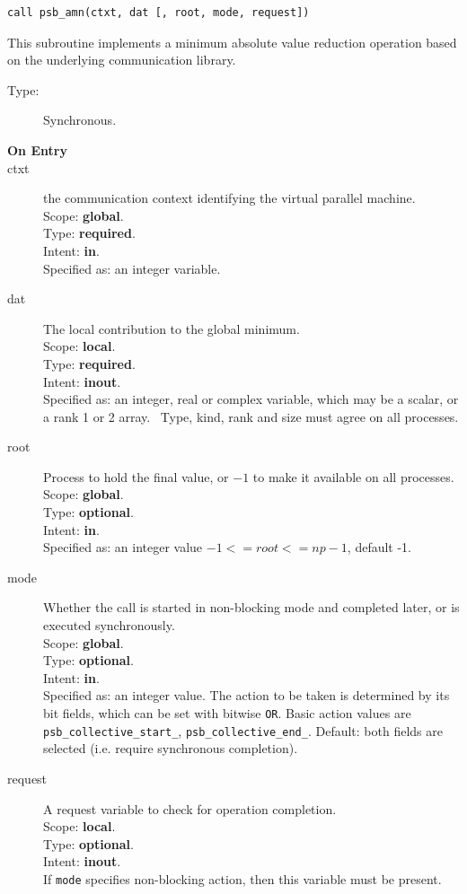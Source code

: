 \begin{verbatim}
call psb_amn(ctxt, dat [, root, mode, request])
\end{verbatim}

This subroutine implements a minimum absolute value reduction
operation based on the underlying communication library. 
\begin{description}
\item[Type:] Synchronous.
\item[\bf  On Entry ]
\item[ctxt] the communication context identifying the virtual
  parallel machine.\\
Scope: {\bf global}.\\
Type: {\bf required}.\\
Intent: {\bf in}.\\
Specified as: an integer variable.
\item[dat] The local contribution to the global minimum.\\
Scope: {\bf local}.\\
Type: {\bf required}.\\
Intent: {\bf inout}.\\
Specified as: an integer, real or complex variable, which may be a
scalar, or a rank 1 or 2 array. \
Type, kind, rank and size must agree on all processes.
\item[root] Process to hold the final value, or $-1$ to make it available
  on all processes.\\
Scope: {\bf global}.\\
Type: {\bf optional}.\\
Intent: {\bf in}.\\
Specified as: an integer value $-1<= root <= np-1$, default -1. \\
\item[mode] Whether the call is started in non-blocking mode and completed
  later, or is executed synchronously.\\
Scope: {\bf global}.\\
Type: {\bf optional}.\\
Intent: {\bf in}.\\
Specified as: an integer value. The action to be taken is determined
by its bit fields, which can be set with bitwise \verb|OR|. Basic
action values are \verb|psb_collective_start_|, \verb|psb_collective_end_|.
Default:  both fields are selected (i.e. require synchronous completion).\\
\item[request] A request variable to check for operation completion.\\
Scope: {\bf local}.\\
Type: {\bf optional}.\\
Intent: {\bf inout}.\\
If \verb|mode| specifies non-blocking action, then this
variable must be present.
\end{description}


